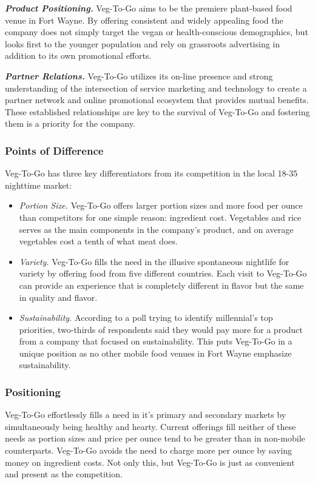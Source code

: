 \documentclass[12pt, letterpaper]{article}
\newcommand{\companyname}{Veg-To-Go}
\begin{document}
\textbf{\emph{Product Positioning.}} \companyname{} aims to be the premiere plant-based food venue in Fort Wayne.  By offering consistent and widely appealing food the company does not simply target the vegan or health-conscious demographics, but looks first to the younger population and rely on grassroots advertising in addition to its own promotional efforts.

\textbf{\emph{Partner Relations.}} \companyname{} utilizes its on-line presence and strong understanding of the intersection of service marketing and technology to create a partner network and online promotional ecosystem that provides mutual benefits. These established relationships are key to the survival of \companyname{} and fostering them is a priority for the company.

\subsubsection{Points of Difference}
\companyname{} has three key differentiators from its competition in the local 18-35 nighttime market:

\begin{itemize}
	\item \emph{Portion Size.}  \companyname{} offers larger portion sizes and more food per ounce than competitors for one simple reason: ingredient cost.  Vegetables and rice serves as the main components in the company's product, and on average vegetables cost a tenth of what meat does. \cite{costs}
	\item \emph{Variety.} \companyname{} fills the need in the illusive spontaneous nightlife for variety by offering food from five different countries.  Each visit to \companyname{} can provide an experience that is completely different in flavor but the same in quality and flavor.
	\item \emph{Sustainability.} According to a poll trying to identify millennial's top priorities, two-thirds of respondents said they would pay more for a product from a company that focused on sustainability. \cite{millennials} This puts \companyname{} in a unique position as no other mobile food venues in Fort Wayne emphasize sustainability.
\end{itemize}

\subsubsection{Positioning}
\companyname{} effortlessly fills a need in it's primary and secondary markets by simultaneously being healthy and hearty.  Current offerings fill neither of these needs as portion sizes and price per ounce tend to be greater than in non-mobile counterparts. \companyname{} avoids the need to charge more per ounce by saving money on ingredient costs.  Not only this, but \companyname{} is just as convenient and present as the competition.
\end{document}
